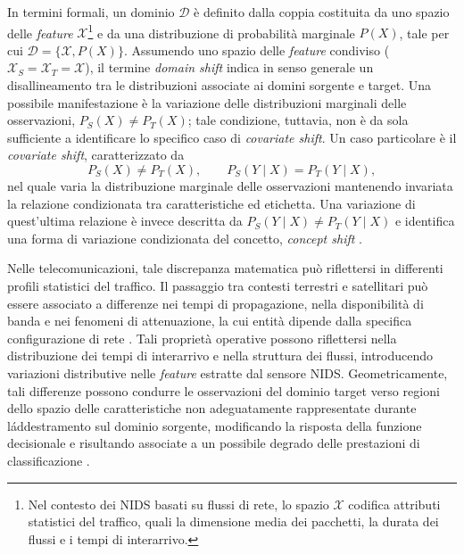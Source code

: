 In termini formali, un dominio $\mathcal{D}$ è definito dalla coppia costituita da uno spazio delle \textit{feature} $\mathcal{X}$\footnote{Nel contesto dei NIDS basati su flussi di rete, lo spazio $\mathcal{X}$ codifica attributi statistici del traffico, quali la dimensione media dei pacchetti, la durata dei flussi e i tempi di interarrivo.} e da una distribuzione di probabilità marginale $P(X)$, tale per cui $\mathcal{D}=\{\mathcal{X},P(X)\}$. 
Assumendo uno spazio delle \textit{feature} condiviso ($\mathcal{X}_S=\mathcal{X}_T=\mathcal{X}$), il termine \textit{domain shift} indica in senso generale un disallineamento tra le distribuzioni associate ai domini sorgente e target. Una possibile manifestazione è la variazione delle distribuzioni marginali delle osservazioni, $P_S(X)\neq P_T(X)$; tale condizione, tuttavia, non è da sola sufficiente a identificare lo specifico caso di \textit{covariate shift}.
Un caso particolare è il \textit{covariate shift}, caratterizzato da
\[ P_S(X)\neq P_T(X), \qquad P_S(Y\mid X)=P_T(Y\mid X), \]
nel quale varia la distribuzione marginale delle osservazioni mantenendo invariata la relazione condizionata tra caratteristiche ed etichetta. 
Una variazione di quest'ultima relazione è invece descritta da
$P_S(Y\mid X)\neq P_T(Y\mid X)$
e identifica una forma di variazione condizionata del concetto, \textit{concept shift} \cite{pan2010}.

Nelle telecomunicazioni, tale discrepanza matematica può riflettersi in differenti profili statistici del traffico. 
Il passaggio tra contesti terrestri e satellitari può essere associato a differenze nei tempi di propagazione, nella disponibilità di banda e nei fenomeni di attenuazione, la cui entità dipende dalla specifica configurazione di rete \cite{kodheli2021, azar2023}. 
Tali proprietà operative possono riflettersi nella distribuzione dei tempi di interarrivo e nella struttura dei flussi, introducendo variazioni distributive nelle \textit{feature} estratte dal sensore NIDS. 
Geometricamente, tali differenze possono condurre le osservazioni del dominio target verso regioni dello spazio delle caratteristiche non adeguatamente rappresentate durante l\'addestramento sul dominio sorgente, modificando la risposta della funzione decisionale e risultando associate a un possibile degrado delle prestazioni di classificazione \cite{farahani2021}.

